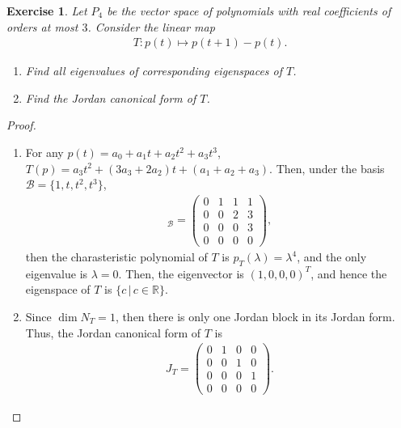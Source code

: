 \documentclass[11pt]{article}
\newtheorem{exercise}{Exercise}[section]
\theoremstyle{definition}
\numberwithin{equation}{subsection}
\begin{document}
\medskip

\begin{exercise}
Let $P_4$ be the vector space of polynomials with real coefficients of orders at most $3$. Consider the linear map
\begin{align*}
    T: p(t) \mapsto p(t + 1) - p(t).
\end{align*}
\begin{enumerate}[label=(\alph*)]
    \item Find all eigenvalues of corresponding eigenspaces of $T$.
    
    \item Find the Jordan canonical form of $T$.
\end{enumerate}
\end{exercise}
\begin{proof}
~\begin{enumerate}[label=(\alph*)]
    \item For any $p(t) = a_0 + a_1 t + a_2 t^2 + a_3 t^3$, $T(p) = a_3 t^2 + (3a_3 + 2a_2)t + (a_1 + a_2 + a_3)$. Then, under the basis $\mathcal{B} = \{1, t, t^2, t^3\}$, 
    \begin{align*}
        [T]_{\mathcal{B}} = \begin{pmatrix}
            0 & 1 & 1 & 1 \\
            0 & 0 & 2 & 3 \\
            0 & 0 & 0 & 3 \\
            0 & 0 & 0 & 0
        \end{pmatrix},
    \end{align*}
    then the charasteristic polynomial of $T$ is $p_T(\lambda) = \lambda^4$, and the only eigenvalue is $\lambda = 0$. Then, the eigenvector is $(1, 0, 0, 0)^T$, and hence the eigenspace of $T$ is $\{c\, | \, c \in \mathbb{R}\}$.
    
    \item Since $\dim N_{T} = 1$, then there is only one Jordan block in its Jordan form. Thus, the Jordan canonical form of $T$ is
    \begin{align*}
        J_T = \begin{pmatrix}
            0 & 1 & 0 & 0 \\
            0 & 0 & 1 & 0 \\
            0 & 0 & 0 & 1 \\
            0 & 0 & 0 & 0
        \end{pmatrix}.
    \end{align*}
\end{enumerate}
\end{proof}
\end{document}
